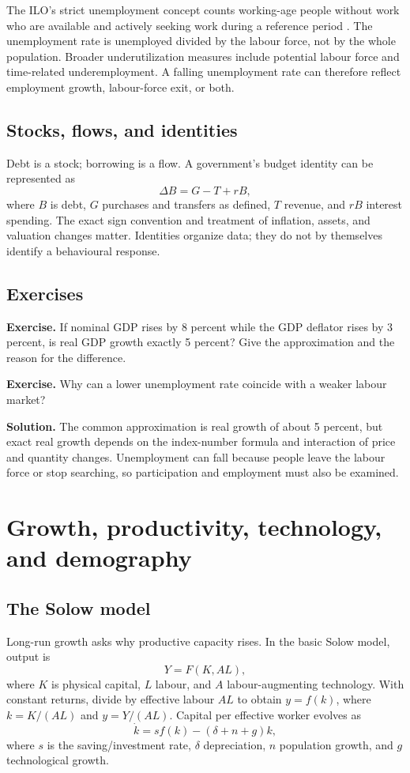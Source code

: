 \documentclass[11pt,oneside,openany]{book}
\newcommand{\exercise}[1]{\textbf{Exercise.} #1}
\newcommand{\solution}[1]{\textbf{Solution.} #1}
\begin{document}
The ILO's strict unemployment concept counts working-age people without work who are available and actively seeking work during a reference period \cite{ilo}. The unemployment rate is unemployed divided by the labour force, not by the whole population. Broader underutilization measures include potential labour force and time-related underemployment. A falling unemployment rate can therefore reflect employment growth, labour-force exit, or both.

\section{Stocks, flows, and identities}

Debt is a stock; borrowing is a flow. A government's budget identity can be represented as
\[
  \Delta B=G-T+rB,
\]
where $B$ is debt, $G$ purchases and transfers as defined, $T$ revenue, and $rB$ interest spending. The exact sign convention and treatment of inflation, assets, and valuation changes matter. Identities organize data; they do not by themselves identify a behavioural response.

\section{Exercises}

\exercise{If nominal GDP rises by 8 percent while the GDP deflator rises by 3 percent, is real GDP growth exactly 5 percent? Give the approximation and the reason for the difference.}

\exercise{Why can a lower unemployment rate coincide with a weaker labour market?}

\solution{The common approximation is real growth of about 5 percent, but exact real growth depends on the index-number formula and interaction of price and quantity changes. Unemployment can fall because people leave the labour force or stop searching, so participation and employment must also be examined.}

\chapter{Growth, productivity, technology, and demography}
\label{ch:growth}

\section{The Solow model}

Long-run growth asks why productive capacity rises. In the basic Solow model, output is
\[
  Y=F(K,AL),
\]
where $K$ is physical capital, $L$ labour, and $A$ labour-augmenting technology. With constant returns, divide by effective labour $AL$ to obtain $y=f(k)$, where $k=K/(AL)$ and $y=Y/(AL)$. Capital per effective worker evolves as
\[
  \dot{k}=s f(k)-(\delta+n+g)k,
\]
where $s$ is the saving/investment rate, $\delta$ depreciation, $n$ population growth, and $g$ technological growth.
\end{document}
